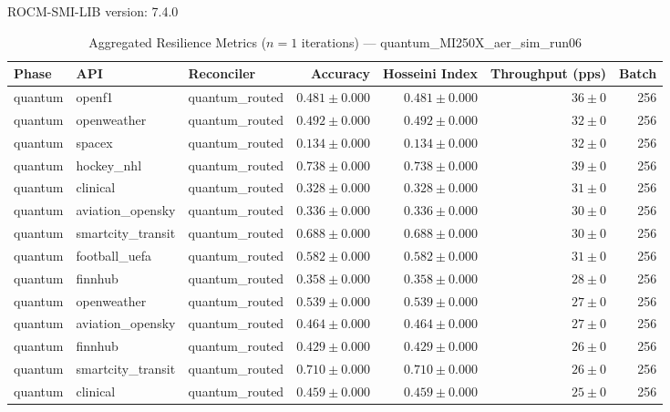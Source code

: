 ROCM-SMI-LIB version: 7.4.0

\begin{table}[htbp]
\caption{Aggregated Resilience Metrics ($n=1$ iterations) --- quantum_MI250X_aer_sim_run06}
\begin{tabular}{l l l r r r r}
\hline
Phase & API & Reconciler & Accuracy & Hosseini Index & Throughput (pps) & Batch \\
\hline
quantum & openf1 & quantum\_routed & $0.481\pm0.000$ & $0.481\pm0.000$ & $36\pm0$ & 256 \\
quantum & openweather & quantum\_routed & $0.492\pm0.000$ & $0.492\pm0.000$ & $32\pm0$ & 256 \\
quantum & spacex & quantum\_routed & $0.134\pm0.000$ & $0.134\pm0.000$ & $32\pm0$ & 256 \\
quantum & hockey\_nhl & quantum\_routed & $0.738\pm0.000$ & $0.738\pm0.000$ & $39\pm0$ & 256 \\
quantum & clinical & quantum\_routed & $0.328\pm0.000$ & $0.328\pm0.000$ & $31\pm0$ & 256 \\
quantum & aviation\_opensky & quantum\_routed & $0.336\pm0.000$ & $0.336\pm0.000$ & $30\pm0$ & 256 \\
quantum & smartcity\_transit & quantum\_routed & $0.688\pm0.000$ & $0.688\pm0.000$ & $30\pm0$ & 256 \\
quantum & football\_uefa & quantum\_routed & $0.582\pm0.000$ & $0.582\pm0.000$ & $31\pm0$ & 256 \\
quantum & finnhub & quantum\_routed & $0.358\pm0.000$ & $0.358\pm0.000$ & $28\pm0$ & 256 \\
quantum & openweather & quantum\_routed & $0.539\pm0.000$ & $0.539\pm0.000$ & $27\pm0$ & 256 \\
quantum & aviation\_opensky & quantum\_routed & $0.464\pm0.000$ & $0.464\pm0.000$ & $27\pm0$ & 256 \\
quantum & finnhub & quantum\_routed & $0.429\pm0.000$ & $0.429\pm0.000$ & $26\pm0$ & 256 \\
quantum & smartcity\_transit & quantum\_routed & $0.710\pm0.000$ & $0.710\pm0.000$ & $26\pm0$ & 256 \\
quantum & clinical & quantum\_routed & $0.459\pm0.000$ & $0.459\pm0.000$ & $25\pm0$ & 256 \\

\end{tabular}
\end{table}
